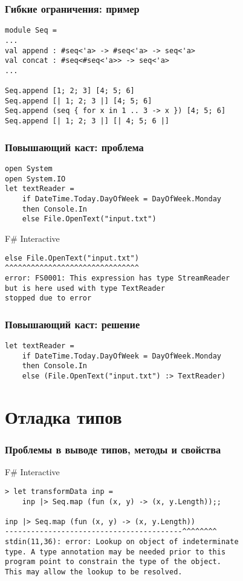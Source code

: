 \documentclass[xetex,mathserif,serif]{beamer}
\begin{document}
	\begin{frame}[fragile]
		\frametitle{Гибкие ограничения: пример}
		\begin{verbatim}
module Seq =
...
val append : #seq<'a> -> #seq<'a> -> seq<'a>
val concat : #seq<#seq<'a>> -> seq<'a>
...

Seq.append [1; 2; 3] [4; 5; 6]
Seq.append [| 1; 2; 3 |] [4; 5; 6]
Seq.append (seq { for x in 1 .. 3 -> x }) [4; 5; 6]
Seq.append [| 1; 2; 3 |] [| 4; 5; 6 |]
		\end{verbatim}
	\end{frame}

	\begin{frame}[fragile]
		\frametitle{Повышающий каст: проблема}
		\begin{verbatim}
open System
open System.IO
let textReader =
    if DateTime.Today.DayOfWeek = DayOfWeek.Monday
    then Console.In
    else File.OpenText("input.txt")
		\end{verbatim}

		\begin{alertblock}{F\# Interactive}
			\begin{verbatim}
else File.OpenText("input.txt")
^^^^^^^^^^^^^^^^^^^^^^^^^^^^^^^
error: FS0001: This expression has type StreamReader 
but is here used with type TextReader 
stopped due to error
			\end{verbatim}
		\end{alertblock}
	\end{frame}

	\begin{frame}[fragile]
		\frametitle{Повышающий каст: решение}
		\begin{verbatim}
let textReader =
    if DateTime.Today.DayOfWeek = DayOfWeek.Monday
    then Console.In
    else (File.OpenText("input.txt") :> TextReader)
		\end{verbatim}
	\end{frame}

	\section{Отладка типов}

	\begin{frame}[fragile]
		\frametitle{Проблемы в выводе типов, методы и свойства}
		\begin{alertblock}{F\# Interactive}
			\begin{verbatim}
> let transformData inp =
    inp |> Seq.map (fun (x, y) -> (x, y.Length));;

inp |> Seq.map (fun (x, y) -> (x, y.Length))
-----------------------------------------^^^^^^^^
stdin(11,36): error: Lookup on object of indeterminate 
type. A type annotation may be needed prior to this 
program point to constrain the type of the object. 
This may allow the lookup to be resolved.
			\end{verbatim}
		\end{alertblock}
	\end{frame}
\end{document}
